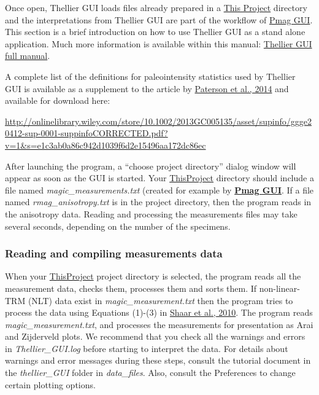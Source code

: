 \documentclass[11pt]{book}
\begin{document}
{{Once open, Thellier GUI loads  files already prepared in a  \href{#ThisProject}{This Project} directory and the interpretations from Thellier GUI are part of the workflow of  \href{#pmag_gui.py}{Pmag GUI}.   This section is a brief introduction on how to use Thellier GUI as a stand alone application. Much more information is available within this manual: \href{https://github.com/PmagPy/PmagPy-Cookbook/blob/gh-pages/thellier_GUI_full_manual.pdf}{Thellier GUI full manual}.

\noindent  A complete list of the definitions for paleointensity statistics used by Thellier GUI is available as a supplement to the article by \href{#http://dx.doi.org/10.1002/2013GC005135}{Paterson et al., 2014}  \nocite{paterson14} and available for download here:

  \url{http://onlinelibrary.wiley.com/store/10.1002/2013GC005135/asset/supinfo/ggge20412-sup-0001-suppinfoCORRECTED.pdf?v=1&s=e1c3ab0a86c942d1039f6d2e15496aa172dc86ec}

After launching the program,  a  ``choose project directory'' dialog window will appear as soon as the GUI is started.
%
%
%
Your  \href{#Project_Directory}{ThisProject} directory should include a file named {\it magic\_measurements.txt} (created for example by \href{#pmag_gui.py}{\bf Pmag GUI}.   If a file named {\it rmag\_anisotropy.txt} is in the project directory, then the program reads in the anisotropy data. Reading and processing the measurements files may take several seconds, depending on the number of the specimens.


\subsubsection{Reading and compiling measurements data}
When your \href{#Project_Directory}{ThisProject}  project directory is selected, the program  reads all the measurement data, checks them, processes them and sorts them. If non-linear-TRM (NLT) data exist in {\it magic\_measurement.txt}  then the program tries to process the data using Equations (1)-(3) in \href{http://dx.doi.org/10.7288/V4/MAGIC/12116}{Shaar et al., 2010}. \nocite{shaar10}  The program reads {\it magic\_measurement.txt}, and processes the measurements for presentation as Arai  and Zijderveld plots.
We recommend that you check all the warnings and errors in {\it Thellier\_GUI.log} before starting to interpret the data.  For details about warnings and error messages during these steps, consult the tutorial document in the {\it thellier\_GUI} folder in  {\it data\_files}.  Also, consult the Preferences to change certain plotting options.

}}
\end{document}
